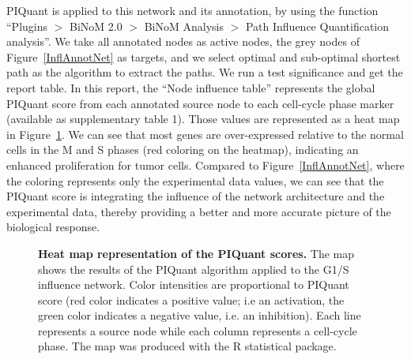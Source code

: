 \documentclass[10pt]{bmc_article}
\newenvironment{bmcformat}{\baselineskip20pt\sloppy\setboolean{publ}{false}}{\baselineskip20pt\sloppy}
\begin{document}
\begin{bmcformat}
PIQuant is applied to this network and its annotation, by using the function
``Plugins $>$ BiNoM 2.0 $>$ BiNoM Analysis $>$ Path Influence Quantification
analysis''. We take all annotated nodes as active nodes, the grey nodes of
Figure~\ref{InflAnnotNet} as targets, and we select optimal and sub-optimal 
shortest path as the algorithm to extract the paths. We run a test significance
and get the report table. In this
report, the ``Node influence table'' represents the global PIQuant score from
each annotated source node to each cell-cycle phase marker (available as
supplementary table 1). Those values are
represented as a heat map in Figure~\ref{PIQuantHeatMap}. We can see that most
genes are over-expressed relative to the normal cells in the M and S phases (red
coloring on the heatmap), indicating an enhanced proliferation for tumor cells.
Compared to Figure~\ref{InflAnnotNet}, where the coloring represents only the
experimental data values, we can see that the PIQuant score is integrating the
influence of the network architecture and the experimental data, thereby
providing a better and more accurate picture of the biological response.


\begin{figure}[h]
  \caption{\label{PIQuantHeatMap} \textbf{Heat map representation of the PIQuant
scores.}
    The map shows the results of the PIQuant algorithm applied to the G1/S
influence network. Color intensities are proportional to PIQuant score (red color indicates a positive
value; i.e an activation, the green color indicates a negative value, i.e. an
inhibition).
Each line represents a source node while each column represents a cell-cycle
phase. The map was produced with the R statistical package.}
 
\end{figure}




\end{bmcformat}
\end{document}
